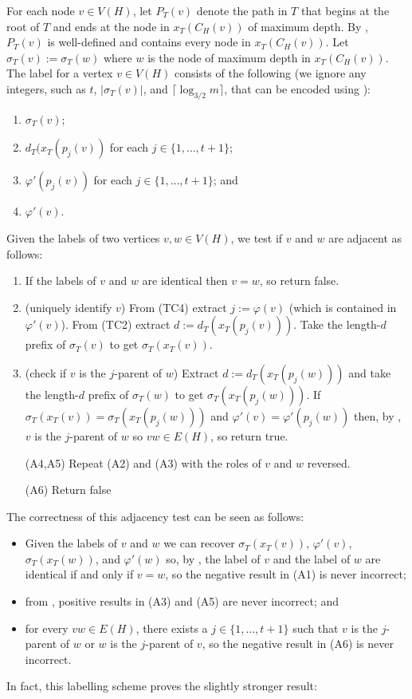 \documentclass[kpfonts]{patmorin}
\begin{document}
For each node $v\in V(H)$, let $P_T(v)$ denote the path in $T$ that begins at the root of $T$ and ends at the node in $x_T(C_H(v))$ of maximum depth.  By , $P_T(v)$ is well-defined and contains every node in $x_T(C_H(v))$.  Let $\sigma_T(v):=\sigma_T(w)$ where $w$ is the node of maximum depth in $x_T(C_H(v))$.  The label for a vertex $v\in V(H)$ consists of the following (we ignore any integers, such as $t$, $|\sigma_T(v)|$, and $\lceil\log_{3/2} m\rceil$, that can be encoded using ):

\begin{enumerate}[(TC1)]
  \item $\sigma_T(v)$;
  \item $d_T(x_T(p_j(v))$ for each $j\in\{1,\ldots,t+1\}$; 
  \item $\varphi'(p_j(v))$ for each $j\in\{1,\ldots,t+1\}$; and
  \item $\varphi'(v)$.
\end{enumerate}

Given the labels of two vertices $v,w\in V(H)$, we test if $v$ and $w$ are adjacent as follows:
\begin{enumerate}[({A}1)]
  \item If the labels of $v$ and $w$ are identical then $v=w$, so return false.
  
  \item (uniquely identify $v$) From (TC4) extract $j:=\varphi(v)$ (which is contained in $\varphi'(v)$).  From (TC2) extract $d:=d_T(x_T(p_j(v)))$. Take the length-$d$ prefix of $\sigma_T(v)$ to get $\sigma_T(x_T(v))$.

  \item (check if $v$ is the $j$-parent of $w$) Extract $d:=d_T(x_T(p_j(w)))$ and take the length-$d$ prefix of $\sigma_T(w)$ to get $\sigma_T(x_T(p_j(w)))$.  If $\sigma_T(x_T(v))=\sigma_T(x_T(p_j(w)))$ and $\varphi'(v)=\varphi'(p_j(w))$ then, by , $v$ is the $j$-parent of $w$ so $vw\in E(H)$, so return true.
  
  \item[(A4,A5)] Repeat (A2) and (A3) with the roles of $v$ and $w$ reversed.
  
  \item[(A6)] Return false
\end{enumerate}

The correctness of this adjacency test can be seen as follows:
\begin{itemize}
  \item Given the labels of $v$ and $w$ we can recover $\sigma_T(x_T(v))$, $\varphi'(v)$, $\sigma_T(x_T(w))$, and $\varphi'(w)$ so, by , the label of $v$ and the label of $w$ are identical if and only if $v=w$, so the negative result in (A1) is never incorrect;
  \item from , positive results in (A3) and (A5) are never incorrect; and 
  \item for every $vw\in E(H)$, there exists a $j\in\{1,\ldots,t+1\}$ such that $v$ is the $j$-parent of $w$ or $w$ is the $j$-parent of $v$, so the negative result in (A6) is never incorrect.    
\end{itemize}
In fact, this labelling scheme proves the slightly stronger result:
\end{document}

